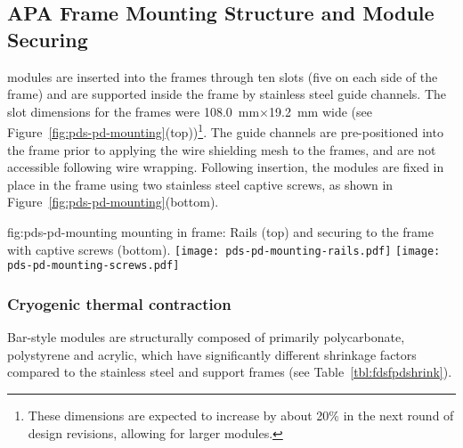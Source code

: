 \subsection{APA Frame Mounting Structure and Module Securing}	
\label{sec:fdsp-pd-assy-frames}

 modules are inserted into the  frames through ten slots 
(five on each side of the  frame) and are supported inside the frame by 
stainless steel guide channels.  The slot dimensions for the   frames 
were \SI{108.0}{mm}$\times$\SI{19.2}{mm} wide (see Figure~\ref{fig:pds-pd-mounting}(top))\footnote{These dimensions are expected to increase by about 20\% in the next round of  design revisions, allowing for larger  modules.}.  
The guide channels are pre-positioned into the  frame prior to applying the wire shielding mesh to the  frames, and are
not accessible following wire wrapping. Following insertion, the  modules are fixed in place in the  frame using
 two stainless steel captive screws, as shown in Figure~\ref{fig:pds-pd-mounting}(bottom).


\begin{dunefigure}{fig:pds-pd-mounting}
{ mounting in  frame: Rails (top) and securing to the frame with captive screws  (bottom).}
	\texttt{[image: pds-pd-mounting-rails.pdf]}
	\texttt{[image: pds-pd-mounting-screws.pdf]}
\end{dunefigure}




\subsubsection{Cryogenic thermal contraction}

Bar-style  modules are structurally composed of primarily polycarbonate, polystyrene and 
acrylic, which have significantly different shrinkage factors compared to the 
stainless steel  and  support frames (see Table~\ref{tbl:fdsfpdshrink}).

